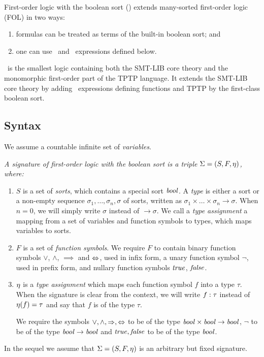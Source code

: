 First-order logic with the boolean sort (\folb) extends many-sorted first-order logic (FOL) in two ways:
\begin{enumerate}
\item formulas can be treated as terms of the built-in boolean sort; and
\item one can use \ITE\ and \LETIN\ expressions defined below.
\end{enumerate}
\folb\ is the smallest logic containing both the SMT-LIB core theory and the monomorphic first-order part of the TPTP language. It extends the SMT-LIB core theory by adding \LETIN\ expressions defining functions and TPTP by the first-class boolean sort.


\subsection{Syntax}

We assume a countable infinite set of \emph{variables}.

\begin{definition}\label{def:folb-signature}\em
  A \emph{signature} of first-order logic with the boolean sort is a triple $\Sigma = (S, F, \eta)$, where:

  \begin{enumerate}
  \item $S$ is a set of \emph{sorts}, which contains a special sort $\mathit{bool}$. A \emph{type} is either a sort or a non-empty sequence $\sigma_1,\ldots,\sigma_n,\sigma$ of sorts, written as $\sigma_1 \times \ldots \times \sigma_n \to \sigma$. When $n = 0$, we will simply write $\sigma$ instead of $\to\sigma$. We call a \emph{type assignment} a mapping from a set of variables and function symbols to types, which maps variables to sorts.

    \item $F$ is a set of \emph{function symbols}. We require $F$ to contain binary function symbols $\vee$, $\wedge$, $\implies$ and $\Leftrightarrow$, used in infix form, a unary function symbol $\neg$, used in prefix form, and nullary function symbols $\mathit{true}$, $\mathit{false}$.

    \item $\eta$ is a \emph{type assignment} which maps each function symbol $f$ into a type $\tau$. When the signature is clear from the context, we will write ${{f}:{\tau}}$ instead of $\eta(f)=\tau$ and say that $f$ is of the type $\tau$.

    We require the symbols $\vee, \wedge, \Rightarrow, \Leftrightarrow$ to be of the type $\mathit{bool} \times \mathit{bool} \to \mathit{bool}$, $\neg$ to be of the type $\mathit{bool} \to \mathit{bool}$ and $\mathit{true},\mathit{false}$ to be of the type $\mathit{bool}$. \QED
  \end{enumerate}
\end{definition}
In the sequel we assume that $\Sigma = (S,F,\eta)$ is an arbitrary but fixed signature.

